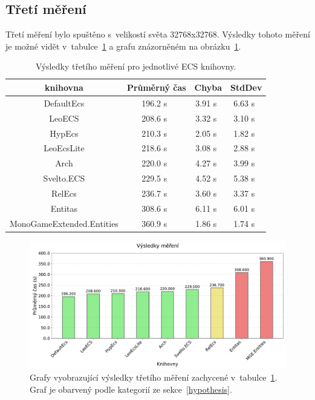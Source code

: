 \subsection{Třetí měření}
Třetí měření bylo spuštěno s~velikostí světa 32768x32768. Výsledky tohoto měření je možné vidět v~tabulce~\ref{tab:third-benchmark-results} a grafu znázorněném na obrázku~\ref{fig:third-benchmark-results}.

\begin{table}[!htb]
    \centering\footnotesize\sf
    \begin{tabular}{c c c c}
        \toprule
        knihovna & Průměrný čas & Chyba & StdDev \\
        \midrule
        DefaultEcs & 196.2 s~& 3.91 s~& 6.63 s~\\
        LeoECS & 208.6 s~& 3.32 s~& 3.10 s~\\
        HypEcs & 210.3 s~& 2.05 s~& 1.82 s~\\
        LeoEcsLite & 218.6 s~& 3.08 s~& 2.88 s~\\
        Arch & 220.0 s~& 4.27 s~& 3.99 s~\\
        Svelto.ECS & 229.5 s~& 4.52 s~& 5.38 s~\\
        RelEcs & 236.7 s~& 3.60  s~& 3.37 s~\\
        Entitas & 308.6 s~&6.11 s~& 6.01 s~\\
        MonoGameExtended.Entities & 360.9 s~& 1.86 s~& 1.74 s~\\
        \bottomrule
    \end{tabular}
    \caption{Výsledky třetího měření pro jednotlivé ECS knihovny.}
    \label{tab:third-benchmark-results}
\end{table}

\begin{figure}[!htb]
    \centering
    \includegraphics[width=1.0\linewidth]{plots/third_benchmark_results.pdf}
    \caption{Grafy vyobrazující výsledky třetího měření zachycené v~tabulce~\ref{tab:third-benchmark-results}. Graf je obarvený podle kategorií ze sekce~\ref{hypothesis}.}
    \label{fig:third-benchmark-results}
\end{figure}

